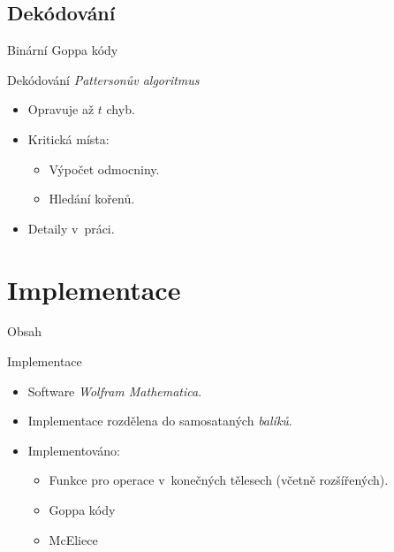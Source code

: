 \documentclass{beamer}
\begin{document}
\subsection{Dekódování}
\begin{frame}{Binární Goppa kódy}

    \begin{block}{Dekódování}
        \pause
        \emph{Pattersonův algoritmus}~\cite{Patterson}
            \pause
        \begin{itemize}
            \item Opravuje až $t$ chyb.
            \item Kritická místa:
                \begin{itemize}
                    \item Výpočet odmocniny.
                    \item Hledání kořenů.
                \end{itemize}
            \pause
            \item Detaily v~práci.
        \end{itemize}

    \end{block}

\end{frame}


\section{Implementace}
\begin{frame}{Obsah}
    \tableofcontents[currentsection]
\end{frame}

\begin{frame}{Implementace}

    \begin{itemize}
        \item Software \emph{Wolfram Mathematica}.
        \item Implementace rozdělena do samosataných \emph{balíků}.
        \item Implementováno:
            \begin{itemize}
                \item Funkce pro operace v~konečných tělesech (včetně
                    rozšířených).
                \item Goppa kódy
                \item McEliece
            \end{itemize}
    \end{itemize}
\end{frame}
\end{document}
